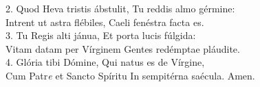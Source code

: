 2. Quod Heva tristis ábstulit, Tu reddis almo gérmine:\\
Intrent ut astra flébiles, Caeli fenéstra facta es.\\

3. Tu Regis alti jánua, Et porta lucis fúlgida:\\
Vitam datam per Vírginem Gentes redémptae pláudite.\\

4. Glória tibi Dómine, Qui natus es de Vírgine,\\
Cum Patr\textit{e} et Sancto Spíritu In sempitérna saécula. Amen.
